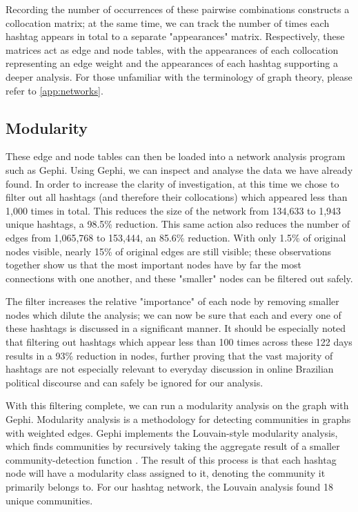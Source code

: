 \documentclass[a4paper,11pt]{article}  %
\begin{document}
	Recording the number of occurrences of these pairwise combinations constructs a collocation matrix; at the same time, we can track the number of times each hashtag appears in total to a separate "appearances" matrix. Respectively, these matrices act as edge and node tables, with the appearances of each collocation representing an edge weight and the appearances of each hashtag supporting a deeper analysis. For those unfamiliar with the terminology of graph theory, please refer to \autoref{app:networks}.

	\subsection{Modularity}
	\label{subsec:modularity}
	These edge and node tables can then be loaded into a network analysis program such as Gephi\parencite{GephiOpenGraph}. Using Gephi, we can inspect and analyse the data we have already found. In order to increase the clarity of investigation, at this time we chose to filter out all hashtags (and therefore their collocations) which appeared less than 1,000 times in total. This reduces the size of the network from 134,633 to 1,943 unique hashtags, a 98.5\% reduction. This same action also reduces the number of edges from 1,065,768 to 153,444, an 85.6\% reduction. With only 1.5\% of original nodes visible, nearly 15\% of original edges are still visible; these observations together show us that the most important nodes have by far the most connections with one another, and these "smaller" nodes can be filtered out safely. 
	
	The filter increases the relative "importance" of each node by removing smaller nodes which dilute the analysis; we can now be sure that each and every one of these hashtags is discussed in a significant manner. It should be especially noted that filtering out hashtags which appear less than 100 times across these 122 days results in a 93\% reduction in nodes, further proving that the vast majority of hashtags are not especially relevant to everyday discussion in online Brazilian political discourse and can safely be ignored for our analysis.
	
	With this filtering complete, we can run a modularity analysis on the graph with Gephi. Modularity analysis is a methodology for detecting communities in graphs with weighted edges. Gephi implements the Louvain-style modularity analysis, which finds communities by recursively taking the aggregate result of a smaller community-detection function \parencite{Findcommunities}. The result of this process is that each hashtag node will have a modularity class assigned to it, denoting the community it primarily belongs to. For our hashtag network, the Louvain analysis found 18 unique communities.
\end{document}
